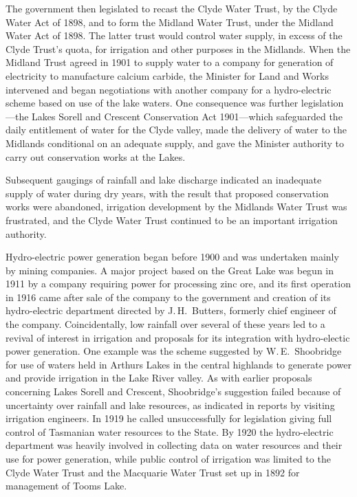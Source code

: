 The government then legislated to recast the Clyde Water Trust, by the
Clyde Water Act of 1898, and to form the Midland Water Trust, under
the Midland Water Act of 1898.  The latter trust would control water
supply, in excess of the Clyde Trust's quota, for irrigation and other
purposes in the Midlands.  When the Midland Trust agreed in 1901 to
supply water to a company for generation of electricity to manufacture
calcium carbide, the Minister for Land and Works intervened and began
negotiations with another company for a hydro-electric scheme based on
use of the lake waters.  One consequence was further legislation---the
Lakes Sorell and Crescent Conservation Act 1901---which safeguarded
the daily entitlement of water for the Clyde valley, made the delivery
of water to the Midlands conditional on an adequate supply, and gave
the Minister authority to carry out conservation works at the
Lakes.

Subsequent gaugings of rainfall and lake discharge indicated an
inadequate supply of water during dry years, with the result that
proposed conservation works were abandoned, irrigation development by
the Midlands Water Trust was frustrated, and the Clyde Water Trust
continued to be an important irrigation authority.

Hydro-electric power generation began before 1900 and was undertaken
mainly by mining companies.  A major project based on the Great Lake
was begun in 1911 by a company requiring power for processing zinc
ore, and its first operation in 1916 came after sale of the company to
the government and creation of its hydro-electric department directed
by J.\,H.~Butters, formerly chief engineer of the company.
Coincidentally, low rainfall over several of these years led to a
revival of interest in irrigation and proposals for its integration
with hydro-electic power generation.  One example was the scheme
suggested by W.\,E.~Shoobridge for use of waters held in Arthurs Lakes
in the central highlands to generate power and provide irrigation in
the Lake River valley.  As with earlier proposals concerning Lakes
Sorell and Crescent, Shoobridge's suggestion failed because of
uncertainty over rainfall and lake resources, as indicated in reports
by visiting irrigation engineers. In 1919 he called unsuccessfully for
legislation giving full control of Tasmanian water resources to the
State.  By 1920 the hydro-electric department was heavily involved in
collecting data on water resources and their use for power generation,
while public control of irrigation was limited to the Clyde Water
Trust and the Macquarie Water Trust set up in 1892 for management of
Tooms Lake.

